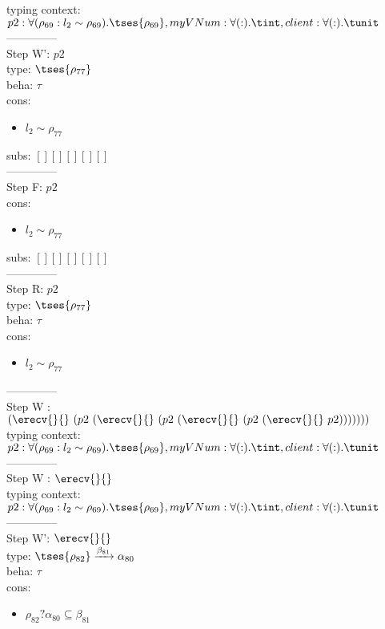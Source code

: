 \documentclass[12pt]{article}
\begin{document}
 typing context: $ p2:\forall (\rho_{69} : l_{2} \sim\rho_{69}).  \tses{ \rho_{69}}, myVNum:\forall ( : ). \tint, client:\forall ( : ). \tunit$ 
\\ --------------\\
Step W': $ p2 $\\
  type: $  \tses{ \rho_{77}} $ 
\\  beha: $ \tau $ 
\\  cons: \begin{itemize}
\item $ l_{2} \sim\rho_{77} $
\end{itemize} 
  subs:  $ [ ] [] [] [] [] $  
 \\--------------\\ 
Step F: $ p2 $
 \\ cons: \begin{itemize}
\item $ l_{2} \sim\rho_{77} $
\end{itemize}
 subs:  $ [ ] [] [] [] [] $ 
  \\--------------\\ 
Step R: $ p2 $\\
  type: $  \tses{ \rho_{77}} $ 
\\  beha: $ \tau $ 
\\  cons: \begin{itemize}
\item $ l_{2} \sim\rho_{77} $
\end{itemize} 
  --------------\\ 
Step W : $ (\erecv{}{}~(p2~(\erecv{}{}~(p2~(\erecv{}{}~(p2~(\erecv{}{}~p2))))))) $\\
 typing context: $ p2:\forall (\rho_{69} : l_{2} \sim\rho_{69}).  \tses{ \rho_{69}}, myVNum:\forall ( : ). \tint, client:\forall ( : ). \tunit$ 
\\ --------------\\
Step W : $ \erecv{}{} $\\
 typing context: $ p2:\forall (\rho_{69} : l_{2} \sim\rho_{69}).  \tses{ \rho_{69}}, myVNum:\forall ( : ). \tint, client:\forall ( : ). \tunit$ 
\\ --------------\\
Step W': $ \erecv{}{} $\\
  type: $  \tses{ \rho_{82}} \xrightarrow{\beta_{81}} \alpha_{80} $ 
\\  beha: $ \tau $ 
\\  cons: \begin{itemize}
\item $ \rho_{82}?\alpha_{80} \subseteq \beta_{81} $
\end{itemize} 
\end{document}
